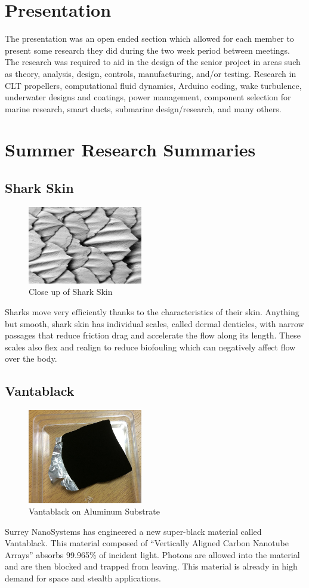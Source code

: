 \documentclass{report}
\begin{document}
\section{Presentation}
The presentation was an open ended section which allowed for each member to present some research they did during the two week period between meetings. The research was required to aid in the design of the senior project in areas such as theory, analysis, design, controls, manufacturing, and/or testing. Research in CLT propellers, computational fluid dynamics, Arduino coding, wake turbulence, underwater designs and coatings, power management, component selection for marine research, smart ducts, submarine design/research, and many others. 
\section{Summer Research Summaries}
\subsection{Shark Skin}
\begin{figure}[h]
\centering
\includegraphics[width=5cm]{"Shark Skin"}
\caption{Close up of Shark Skin}
\end{figure}
Sharks move very efficiently thanks to the characteristics of their skin.  Anything but smooth, shark skin has individual scales, called dermal denticles, with narrow passages that reduce friction drag and accelerate the flow along its length.  These scales also flex and realign to reduce biofouling which can negatively affect flow over the body.

\subsection{Vantablack}
\begin{figure}[h]
\centering
\includegraphics[width=5cm]{"Vantablack"}
\caption{Vantablack on Aluminum Substrate}
\end{figure}
Surrey NanoSystems has engineered a new super-black material called Vantablack.  This material composed of “Vertically Aligned Carbon Nanotube Arrays” absorbs 99.965\% of incident light.  Photons are allowed into the material and are then blocked and trapped from leaving.  This material is already in high demand for space and stealth applications. 
\end{document}
